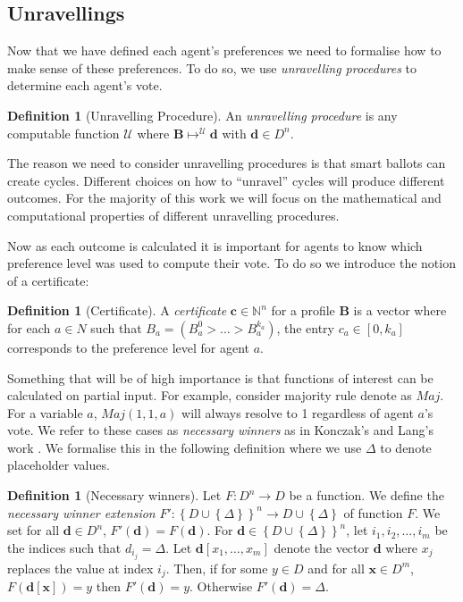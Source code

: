 \documentclass[11pt,a4paper, titlepage]{article}
\theoremstyle{definition}
\newtheorem{definition}[theorem]{Definition}
\let\vec\mathbf
\begin{document}
\subsection{Unravellings}

Now that we have defined each agent's preferences we need to formalise how to make sense of these preferences. To do so, we use \emph{unravelling procedures} to determine each agent's vote.

\begin{definition}[Unravelling Procedure]
    An \emph{unravelling procedure} is any computable function $\mathcal{U}$ where $\mathbf{B} \mapsto^\mathcal{U} \vec{d}$ with $\vec{d} \in D^n$.
\end{definition}

The reason we need to consider unravelling procedures is that smart ballots can create cycles.
Different choices on how to ``unravel'' cycles will produce different outcomes.
For the majority of this work we will focus on the mathematical and computational properties of different unravelling procedures.


Now as each outcome is calculated it is important for agents to know which preference level was used to compute their vote. 
To do so we introduce the notion of a certificate:

\begin{definition}[Certificate]
    A \emph{certificate} $\mathbf{c} \in \mathbb{N}^n$ for a profile $\mathbf{B}$ is a vector where for each $a \in N$ such that $B_a = (B_a^0 > \ldots > B_a^{k_a})$, the entry $c_a \in [0, k_a]$ corresponds to the preference level for agent $a$.  
\end{definition}


Something that will be of high importance is that functions of interest can be calculated on partial input.  
For example, consider majority rule denote as $\mathit{Maj}$. For a variable $a$, $\mathit{Maj}(1, 1, a)$ will always resolve to 1 regardless of agent $a$'s vote. 
We refer to these cases as \emph{necessary winners} as in Konczak's and Lang's work \cite{konczak2005voting}.
We formalise this in the following definition where we use $\Delta$ to denote placeholder values.

\begin{definition}[Necessary winners]
    Let $F \colon D^n \longrightarrow D $ be a function.
    We define the \emph{necessary winner extension} $F' \colon \left\{D \cup \left\{\Delta\right\}\right\}^n \longrightarrow D \cup \left\{\Delta\right\}$ of function $F$. 
    We set for all $\vec{d} \in D^n$, $F'(\vec{d}) = F(\vec{d})$.
    For $\vec{d} \in \left\{D \cup \left\{\Delta\right\}\right\}^n$, let $i_1, i_2, \ldots, i_m$ be the indices such that $d_{i_j} = \Delta$.
    Let $\vec{d}[x_1, \ldots, x_m]$ denote the vector $\vec{d}$ where $x_j$ replaces the value at index $i_j$. Then, if for some $y \in D$ and for all $\vec{x} \in D^m$, $F(\vec{d}[\vec{x}]) = y$ then $F'(\vec{d}) = y$.
    Otherwise $F'(\vec{d}) = \Delta$.
\end{definition}
\end{document}
